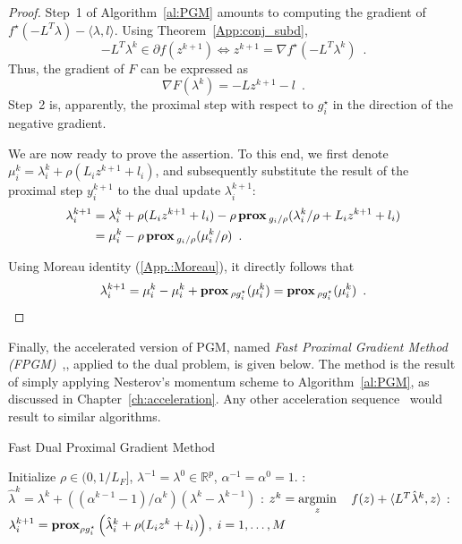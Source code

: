\documentclass[openany]{now}
\newcommand{\reals}{{\mathbb R}}
\newcommand{\argmin}{\mathop{\rm argmin}}
\newcommand{\prox}{\mathop{\bf prox}}
\begin{document}
\begin{proof}
Step~1 of Algorithm~\ref{al:PGM} amounts to computing the gradient of $f^\star(-L^T\lambda)-\langle  \lambda,l\rangle $. Using Theorem~\ref{App:conj_subd}, 
\begin{equation*}
  -L^T\lambda^k \in \partial f(z^{k+1}) \Leftrightarrow z^{k+1} = \nabla f^\star(-L^T\lambda^k)\enspace.
\end{equation*}
Thus, the gradient of $F$ can be expressed as
\[
\nabla F(\lambda^k) = -Lz^{k+1} - l\enspace.
\]
Step~2 is, apparently, the proximal step with respect to $g^\star_i$ in the direction of the negative gradient.

We are now ready to prove the assertion. To this end, we first denote $\mu_i^k=\lambda_i^k + \rho(L_i z^{k+1}+l_i)$, and subsequently substitute the result of the proximal step $y_i^{k+1}$ to the dual update $\lambda_i^{k+1}$\enspace:
\begin{align*}
 \lambda_i^{k+1} &= \lambda_i^k + \rho(L_i z^{k+1}+l_i) - \rho\prox{_{g_i/\rho}}(\lambda_i^k/\rho + L_i z^{k+1}+l_i) \\
                 &= \mu_i^k- \rho\prox{_{g_i/\rho}}(\mu_i^k/\rho)\enspace.
\end{align*}

Using Moreau identity (\ref{App.:Moreau}), it directly follows that
\begin{equation*}
 \lambda_i^{k+1} = \mu_i^k- \mu_i^k+ \prox{_{\rho g^\star_i}}(\mu_i^k) = \prox{_{\rho g_i^\star}}(\mu_i^k)\enspace.
\end{equation*}
\end{proof}

Finally, the accelerated version of PGM, named \emph{Fast Proximal Gradient Method (FPGM)}~\cite{beck2014fast},\cite{Giselsson:fbds}, applied to the dual problem, is given below. The method is the result of simply applying Nesterov's momentum scheme to Algorithm~\ref{al:PGM}, as discussed in Chapter~\ref{ch:acceleration}. Any other acceleration sequence~\cite{tseng2008accelerated} would result to similar algorithms.
\begin{algorithm}[H]
\caption{Fast Dual Proximal Gradient Method}
\label{al:FPGM}
\begin{algorithmic} 
\REQUIRE Initialize $\rho \in (0,1/L_F]$, $\lambda^{-1}=\lambda^{0}\in\reals^p$, $\alpha^{-1}=\alpha^{0}=1$.
\LOOP
{}: $\hat{\lambda}^{k} = \lambda^{k}+((\alpha^{k-1}-1)/\alpha^k)(\lambda^k-\lambda^{k-1})$
: $z^{k} = \argmin\limits_z \quad f(z) + \langle  L^T\hat{\lambda}^k, z\rangle $
: $\lambda_i^{k+1} = \prox_{\rho g_i^\star}\left(\hat{\lambda}_i^k+\rho(L_iz^{k}+l_i)\right), \; i=1,\ldots,M$
\ENDLOOP
\end{algorithmic}
\end{algorithm}\begin{footnotesize}
\end{footnotesize}
\end{document}
